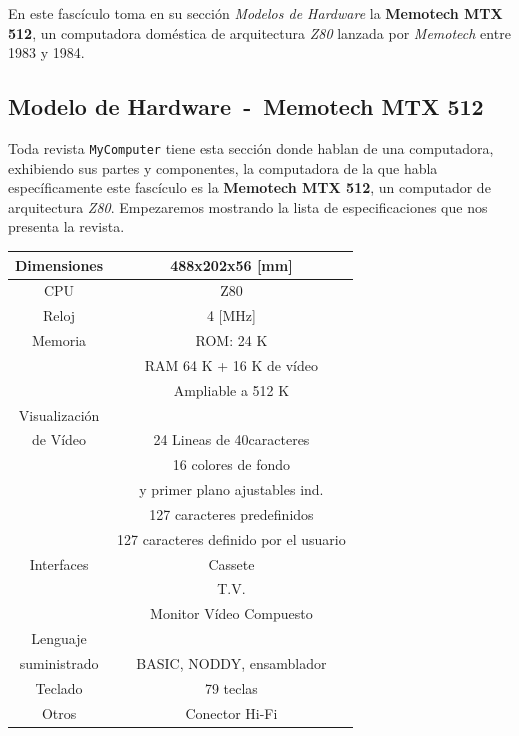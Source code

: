 \documentclass{article}
\begin{document}
En este fascículo toma en su sección \textit{Modelos de Hardware} la \textbf{Memotech MTX 512}, un computadora
doméstica de arquitectura \textit{Z80} lanzada por \textit{Memotech} entre 1983 y 1984.
\\
\begin{multicols}{2}

\section{Modelo de Hardware\ -\ Memotech MTX 512}

Toda revista \texttt{MyComputer} tiene esta sección donde hablan de una computadora, exhibiendo sus partes y
componentes, la computadora de la que habla específicamente este fascículo es la \textbf{Memotech MTX 512},
un computador de arquitectura \textit{Z80}. Empezaremos mostrando la lista de especificaciones que nos presenta
la revista.

\begin{table}[h]
  \centering
  \begin{tabular}{|c||c|}
    \hline
    Dimensiones&488x202x56 [mm]\\\hline
    CPU&Z80\\\hline
    Reloj&4 [MHz]\\\hline
    Memoria&ROM: 24 K\\\cline{2-2}
               &RAM 64 K + 16 K de vídeo\\\cline{2-2}
               &Ampliable a 512 K\\\hline
    Visualización& \\de Vídeo&24 Lineas de 40caracteres\\\cline{2-2}
               &16 colores de fondo \\
               & y primer plano ajustables ind.\\\cline{2-2}
               &127 caracteres predefinidos\\\cline{2-2}
               &127 caracteres definido por el usuario\\\hline
    Interfaces&Cassete\\\cline{2-2}
               &T.V.\\\cline{2-2}
               &Monitor Vídeo Compuesto\\\hline
    Lenguaje& \\suministrado& BASIC, NODDY, ensamblador\\\hline
    Teclado&79 teclas\\\hline
    Otros&Conector Hi-Fi\\\hline
  \end{tabular}
\end{table}


\end{multicols}
\end{document}
